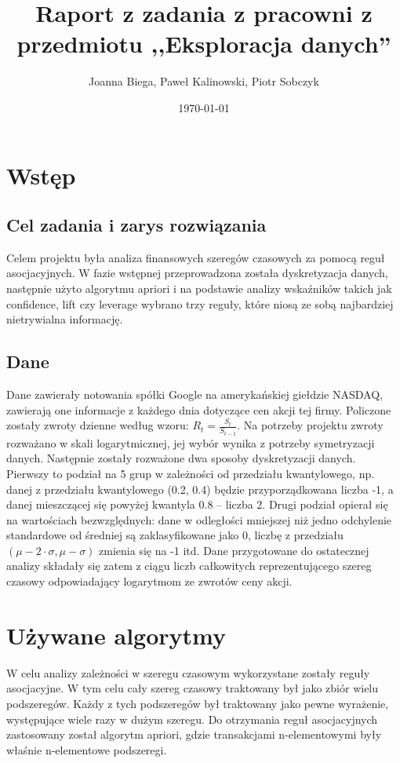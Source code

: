 \documentclass[a4paper,10pt]{article}
\title{Raport z zadania z pracowni z przedmiotu ,,Eksploracja danych''}
\date{\today}
\author{Joanna Biega, Paweł Kalinowski, Piotr Sobczyk}
\begin{document}
\maketitle
\section{Wstęp}

\subsection{Cel zadania i zarys rozwiązania}
Celem projektu była analiza finansowych szeregów czasowych za pomocą reguł asocjacyjnych. W fazie wstępnej przeprowadzona została dyskretyzacja danych, następnie
użyto algorytmu apriori i na podstawie analizy wskaźników takich jak confidence, lift czy leverage wybrano trzy reguły, które niosą ze sobą najbardziej
nietrywialna informację.

\subsection{Dane}
Dane zawierały notowania spółki Google na amerykańskiej giełdzie 
NASDAQ, zawierają one informacje z każdego dnia dotyczące cen akcji tej firmy. Policzone zostały zwroty dzienne według wzoru: $R_t = \frac{S_t}{S_{t-1}}$.
Na potrzeby projektu zwroty rozważano w skali logarytmicznej, jej wybór wynika z potrzeby symetryzacji danych. 
Następnie zostały rozważone dwa sposoby dyskretyzacji danych. Pierwszy to podział na 5 grup w zależności od przedziału kwantylowego, 
np. danej z przedziału kwantylowego (0.2, 0.4) będzie przyporządkowana liczba -1, a danej mieszczącej się powyżej kwantyla 0.8 – liczba 2.
Drugi podział opierał się na wartościach bezwzględnych: dane w odległości mniejszej niż jedno odchylenie standardowe od średniej są zaklasyfikowane 
jako 0, liczbę z przedziału $(\mu - 2 \cdot \sigma, \mu - \sigma)$ zmienia się na -1 itd.
Dane przygotowane do ostatecznej analizy składały się zatem z ciągu liczb całkowitych reprezentującego szereg czasowy odpowiadający logarytmom ze zwrotów ceny akcji.

\section{Używane algorytmy}
W celu analizy zależności w szeregu czasowym wykorzystane zostały reguły asocjacyjne. W tym celu cały szereg czasowy traktowany był
 jako zbiór wielu podszeregów. Każdy z tych podszeregów był traktowany jako pewne wyrażenie, występujące wiele razy w dużym szeregu. 
Do otrzymania reguł asocjacyjnych zastosowany został algorytm apriori, gdzie transakcjami n-elementowymi były właśnie n-elementowe podszeregi.
\end{document}
